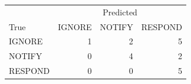 \begin{tabular}{lrrr}
\toprule
 & \multicolumn{3}{c}{Predicted} \\
True & IGNORE & NOTIFY & RESPOND \\
\midrule
IGNORE & 1 & 2 & 5 \\
NOTIFY & 0 & 4 & 2 \\
RESPOND & 0 & 0 & 5 \\
\bottomrule
\end{tabular}
